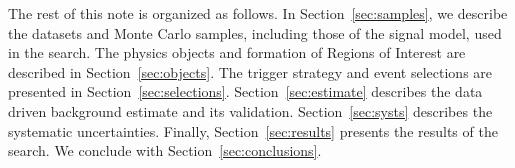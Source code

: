 The rest of this note is organized as follows.
In Section~\ref{sec:samples}, we describe the datasets and Monte Carlo samples, including those of the signal model, used in the search. 
The physics objects and formation of Regions of Interest are described in Section~\ref{sec:objects}.
The trigger strategy and event selections are presented in Section~\ref{sec:selections}. 
Section~\ref{sec:estimate} describes the data driven background estimate and its validation. 
Section~\ref{sec:systs} describes the systematic uncertainties.
Finally, Section~\ref{sec:results} presents the results of the search.
We conclude with Section~\ref{sec:conclusions}.
